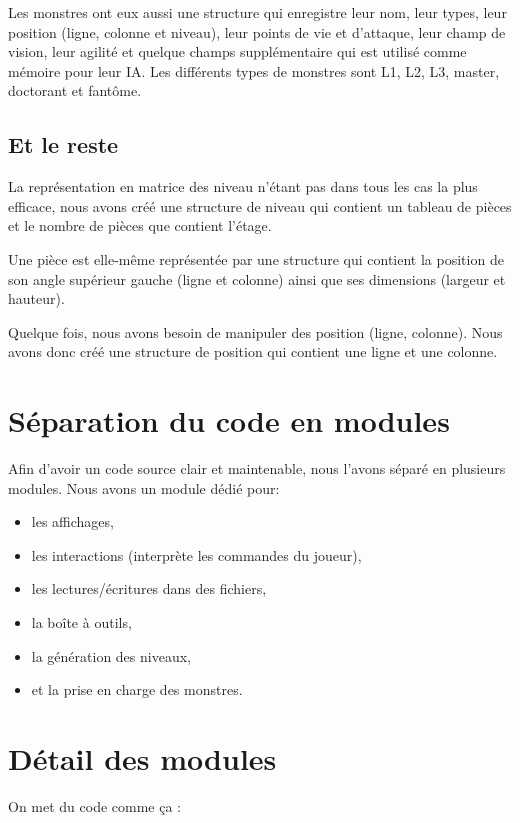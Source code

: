 \documentclass[11pt]{report}
\begin{document}
		Les monstres ont eux aussi une structure qui enregistre leur nom, leur types, leur position (ligne, colonne et niveau), leur points de vie et d'attaque, leur champ de vision, leur agilité et quelque champs supplémentaire qui est utilisé comme mémoire pour leur IA. Les différents types de monstres sont L1, L2, L3, master, doctorant et fantôme.
		
		\subsection{Et le reste}
		
		La représentation en matrice des niveau n'étant pas dans tous les cas la plus efficace, nous avons créé une structure de niveau qui contient un tableau de pièces et le nombre de pièces que contient l'étage.
		
		Une pièce est elle-même représentée par une structure qui contient la position de son angle supérieur gauche (ligne et colonne) ainsi que ses dimensions (largeur et hauteur).
		
		Quelque fois, nous avons besoin de manipuler des position (ligne, colonne). Nous avons donc créé une structure de position qui contient une ligne et une colonne. 
		
	\section{Séparation du code en modules}
	
	Afin d'avoir un code source clair et maintenable, nous l'avons séparé en plusieurs modules. Nous avons un module dédié pour:
	\begin{itemize}
		\item les affichages,
		\item les interactions (interprète les commandes du joueur),
		\item les lectures/écritures dans des fichiers,
		\item la boîte à outils,
		\item la génération des niveaux,
		\item et la prise en charge des monstres.
	\end{itemize}
	
	
	\section{Détail des modules}

	On met du code comme ça : 
	
\end{document}
